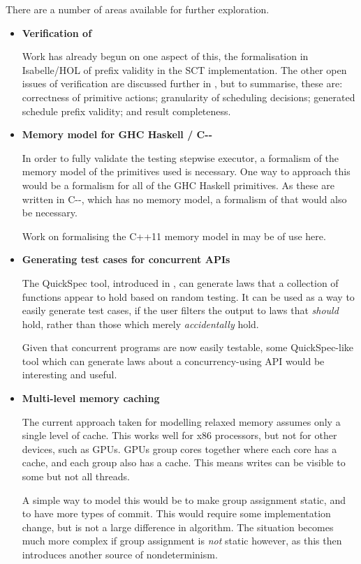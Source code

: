 There are a number of areas available for further exploration. 

\begin{itemize}
\item \textbf{Verification of \dejafu{}} \hfill

  Work has already begun on one aspect of this, the formalisation in
  Isabelle/HOL of prefix validity in the SCT implementation. The other
  open issues of verification are discussed further in
  , but to summarise, these are: correctness of
  primitive actions; granularity of scheduling decisions; generated
  schedule prefix validity; and result completeness.

\item \textbf{Memory model for GHC Haskell / C{-}{-}} \hfill

  In order to fully validate the testing stepwise executor, a
  formalism of the memory model of the primitives used is
  necessary. One way to approach this would be a formalism for all of
  the GHC Haskell primitives. As these are written in C{-}{-}, which
  has no memory model, a formalism of that would also be necessary.

  Work on formalising the C++11 memory model in \citep{c++11} may be
  of use here.

\item \textbf{Generating test cases for concurrent APIs} \hfill

  The QuickSpec tool, introduced in \citep{quickspec}, can generate
  laws that a collection of functions appear to hold based on random
  testing. It can be used as a way to easily generate test cases, if
  the user filters the output to laws that \emph{should} hold, rather
  than those which merely \emph{accidentally} hold.

  Given that concurrent programs are now easily testable, some
  QuickSpec-like tool which can generate laws about a
  concurrency-using API would be interesting and useful.

\item \textbf{Multi-level memory caching} \hfill

  The current approach taken for modelling relaxed memory assumes only
  a single level of cache. This works well for x86 processors, but not
  for other devices, such as GPUs. GPUs group cores together where
  each core has a cache, and each group also has a cache. This means
  writes can be visible to some but not all threads.

  A simple way to model this would be to make group assignment static,
  and to have more types of commit. This would require some
  implementation change, but is not a large difference in
  algorithm. The situation becomes much more complex if group
  assignment is \emph{not} static however, as this then introduces
  another source of nondeterminism.


\end{itemize}
